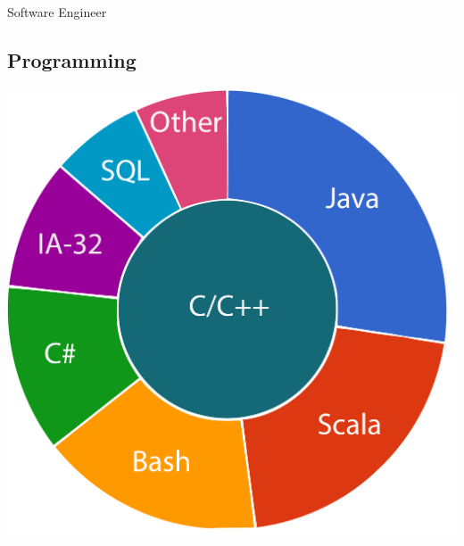 \documentclass[]{friggeri-cv}
\begin{document}
      {Software Engineer}
      

\begin{aside}
\vspace{3.1cm}
  \section{Programming}
    \includegraphics[width=0.18\paperwidth]{img/programming.pdf}
    ~
    ~

\end{aside}
\end{document}
